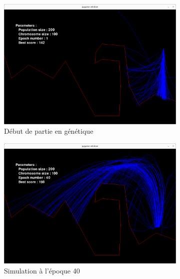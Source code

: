 \documentclass[french,a4paper,10pt,twocolumn]{article}
\begin{document}
\begin{figure}[H]
    \centering
    \begin{subfigure}[b]{0.45\textwidth}
        \centering
        \includegraphics[width=\textwidth]{images/first_epoch_rc_ga.png}
        \caption{Début de partie en génétique}
    \end{subfigure}
    \hfill
    \begin{subfigure}[b]{0.45\textwidth}
        \centering
        \includegraphics[width=\textwidth]{images/40_epoch_rc_ga.png}
        \caption{Simulation à l'époque 40}
    \end{subfigure}
    \hfill
    \begin{subfigure}[b]{0.45\textwidth}
        \centering

\end{subfigure}
\end{figure}
\end{document}
